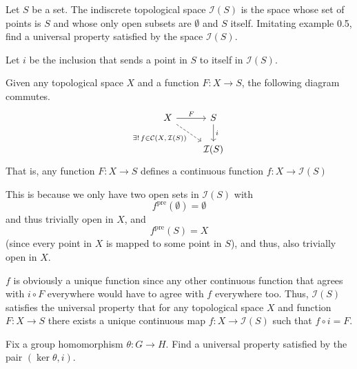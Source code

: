 \documentclass[letterpaper, 12pt]{hmcpset}
\begin{document}
\begin{problem}[0.10]
	Let $S$ be a set. The indiscrete topological space $\mathcal I(S)$ is the space whose set of points is $S$ and whose only open subsets are $\emptyset$ and $S$ itself. Imitating example 0.5, find a universal property satisfied by the space $\mathcal I(S)$.
\end{problem}

\begin{solution}
	Let $i$ be the inclusion that sends a point in $S$ to itself in $\mathcal I(S)$.

	Given any topological space $X$ and a function $F : X \to S$, the following diagram commutes.
	\[
		\begin{tikzcd}
			X \arrow[r, "F"] \arrow[rd, dashrightarrow, "\exists ! \, f \in \mathcal C({X, \, \mathcal I(S)})"']
			& S \arrow[d, "i"] \\
			& \mathcal I(S)
		\end{tikzcd}
	\]
	That is, any function $F : X \to S$ defines a continuous function $f : X \to \mathcal{I}(S)$

	This is because we only have two open sets in $\mathcal I(S)$ with
	\[
		f^\text{pre}(\emptyset) = \emptyset
	\]
	and thus trivially open in $X$, and
	\[
		f^\text{pre}(S) = X
	\]
	(since every point in $X$ is mapped to some point in $S$), and thus, also trivially open in $X$.

	$f$ is obviously a unique function since any other continuous function that agrees with $i \circ F$ everywhere would have to agree with $f$ everywhere too. Thus, $\mathcal I(S)$ satisfies the universal property that for any topological space $X$ and function $F : X \to S$ there exists a unique continuous map $f : X \to \mathcal I(S)$ such that $f \circ i = F$.
\end{solution}

\pagebreak

\begin{problem}[0.11]
	Fix a group homomorphism $\theta : G \to H$. Find a universal property satisfied by the pair $(\ker \theta, i)$.
\end{problem}
\end{document}
